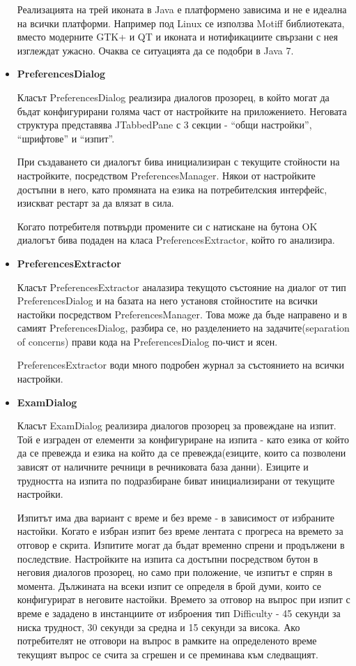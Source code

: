 \begin{itemize}
      Реализацията на трей иконата в Java е платформено зависима и не
      е идеална на всички платформи. Например под Linux се използва
      Motiff библиотеката, вместо модерните GTK+ и QT и иконата и
      нотификациите свързани с нея изглеждат ужасно. Очаква се
      ситуацията да се подобри в Java 7.
    \item \textbf{PreferencesDialog}

      Класът PreferencesDialog реализира диалогов прозорец, в който
      могат да бъдат конфигурирани голяма част от настройките на
      приложението. Неговата структура представява JTabbedPane с 3
      секции - "`общи настройки"', "`шрифтове"' и "`изпит"'.

      При създаването си диалогът бива инициализиран с текущите
      стойности на настройките, посредством PreferencesManager. Някои
      от настройките достъпни в него, като промяната на езика на
      потребителския интерфейс, изискват рестарт за да влязат в сила.

      Когато потребителя потвърди промените си с натискане на бутона
      OK диалогът бива подаден на класа PreferencesExtractor, който го
      анализира. 
    \item \textbf{PreferencesExtractor}

      Класът PreferencesExtractor аналазира текущото състояние на
      диалог от тип PreferencesDialog и на базата на него установя
      стойностите на всички настойки посредством
      PreferencesManager. Това може да бъде направено и в самият
      PreferencesDialog, разбира се, но разделението на
      задачите(separation of concerns) прави кода на PreferencesDialog
      по-чист и ясен.

      PreferencesExtractor води много подробен журнал за състоянието
      на всички настройки.
    \item \textbf{ExamDialog}

      Класът ExamDialog реализира диалогов прозорец за провеждане на
      изпит. Той е изграден от елементи за конфигуриране на изпита -
      като езика от който да се превежда и езика на който да се
      превежда(езиците, които са позволени зависят от наличните
      речници в речниковата база данни). Езиците и трудността на
      изпита по подразбиране биват инициализирани от текущите
      настройки.

      Изпитът има два вариант с време и без време - в зависимост от
      избраните настойки. Когато е избран изпит без време лентата с
      прогреса на времето за отговор е скрита. Изпитите могат да бъдат
      временно спрени и продължени в последствие. Настройките на
      изпита са достъпни посредством бутон в неговия диалогов
      прозорец, но само при положение, че изпитът е спрян в
      момента. Дължината на всеки изпит се определя в брой думи, които
      се конфигурират в неговите настойки. Времето за отговор на
      въпрос при изпит с време е зададено в инстанциите от изброения
      тип Difficulty - 45 секунди за ниска трудност, 30 секунди за
      средна и 15 секунди за висока. Ако потребителят не отговори на
      въпрос в рамките на определеното време текущият въпрос се счита
      за сгрешен и се преминава към следващият.


\end{itemize}

